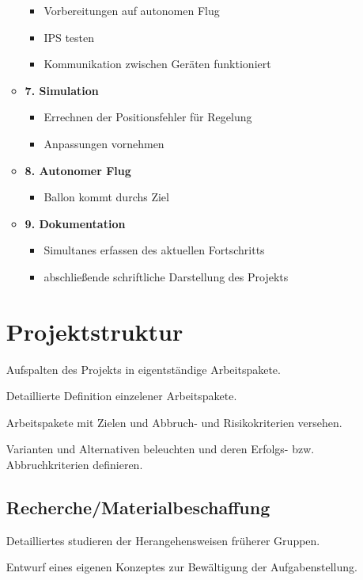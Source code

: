 \documentclass[lang=ngerman,inputenc=utf8,fontsize=10pt]{ldvarticle}
\begin{document}
\begin{itemize}
\begin{itemize}
		\begin{itemize}
			\item Vorbereitungen auf autonomen Flug
			\item IPS testen
			\item Kommunikation zwischen Geräten funktioniert
		\end{itemize}
	\item \textbf{7. Simulation} 
		\begin{itemize}
			\item Errechnen der Positionsfehler für Regelung
			\item Anpassungen vornehmen
		\end{itemize}
		\item \textbf{8. Autonomer Flug} 
		\begin{itemize}
			\item Ballon kommt durchs Ziel
			
		\end{itemize}
	\item \textbf{9. Dokumentation}  
		\begin{itemize}
		\item Simultanes erfassen des aktuellen Fortschritts
		\item abschließende schriftliche Darstellung des Projekts
		\end{itemize}


\end{itemize}

\section{Projektstruktur}

Aufspalten des Projekts in eigentständige Arbeitspakete.

Detaillierte Definition einzelener Arbeitspakete.

Arbeitspakete mit Zielen und Abbruch- und Risikokriterien versehen.

Varianten und Alternativen beleuchten und deren Erfolgs- bzw. Abbruchkriterien definieren.

\subsection*{Recherche/Materialbeschaffung}

Detailliertes studieren der Herangehensweisen früherer Gruppen.

Entwurf eines eigenen Konzeptes zur Bewältigung der Aufgabenstellung. 


\end{itemize}
\end{document}
